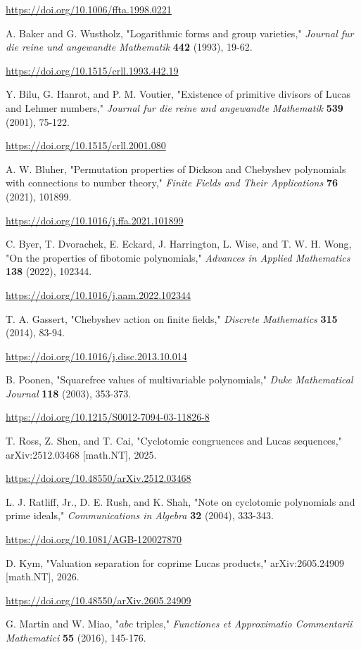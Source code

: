 \documentclass[11pt]{article}
\begin{document}
\url{https://doi.org/10.1006/ffta.1998.0221}

A. Baker and G. Wustholz, "Logarithmic forms and group varieties,"
\emph{Journal fur die reine und angewandte Mathematik} \textbf{442} (1993), 19-62.

\url{https://doi.org/10.1515/crll.1993.442.19}

Y. Bilu, G. Hanrot, and P. M. Voutier, "Existence of primitive divisors of
Lucas and Lehmer numbers," \emph{Journal fur die reine und angewandte
Mathematik} \textbf{539} (2001), 75-122.

\url{https://doi.org/10.1515/crll.2001.080}

A. W. Bluher, "Permutation properties of Dickson and Chebyshev polynomials
with connections to number theory," \emph{Finite Fields and Their Applications}
\textbf{76} (2021), 101899.

\url{https://doi.org/10.1016/j.ffa.2021.101899}

C. Byer, T. Dvorachek, E. Eckard, J. Harrington, L. Wise, and
T. W. H. Wong,
"On the properties of fibotomic polynomials,"
\emph{Advances in Applied Mathematics} \textbf{138} (2022), 102344.

\url{https://doi.org/10.1016/j.aam.2022.102344}

T. A. Gassert, "Chebyshev action on finite fields," \emph{Discrete
Mathematics} \textbf{315} (2014), 83-94.

\url{https://doi.org/10.1016/j.disc.2013.10.014}

B. Poonen, "Squarefree values of multivariable polynomials," \emph{Duke
Mathematical Journal} \textbf{118} (2003), 353-373.

\url{https://doi.org/10.1215/S0012-7094-03-11826-8}

T. Ross, Z. Shen, and T. Cai, "Cyclotomic congruences and Lucas sequences,"
arXiv:2512.03468 [math.NT], 2025.

\url{https://doi.org/10.48550/arXiv.2512.03468}

L. J. Ratliff, Jr., D. E. Rush, and K. Shah, "Note on cyclotomic
polynomials and prime ideals," \emph{Communications in Algebra} \textbf{32} (2004),
333-343.

\url{https://doi.org/10.1081/AGB-120027870}

D. Kym, "Valuation separation for coprime Lucas products,"
arXiv:2605.24909 [math.NT], 2026.

\url{https://doi.org/10.48550/arXiv.2605.24909}

G. Martin and W. Miao, "\(abc\) triples," \emph{Functiones et Approximatio
Commentarii Mathematici} \textbf{55} (2016), 145-176.
\end{document}
